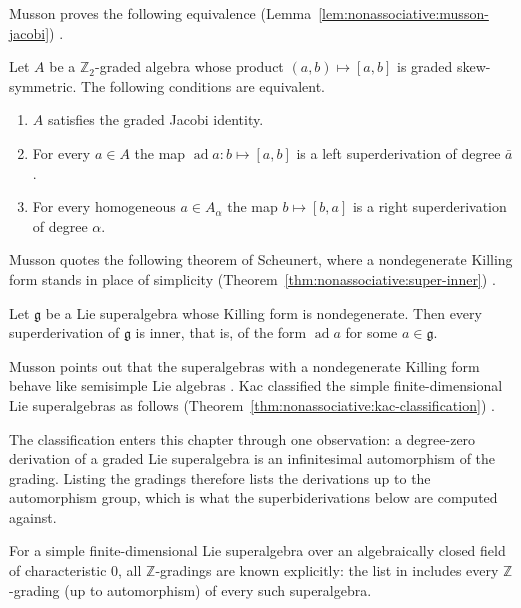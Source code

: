 Musson proves the following equivalence (Lemma~\ref{lem:nonassociative:musson-jacobi}) \cite[Lemma~1.1.2,
pp.~2--3]{Musson2012}.\begin{lemma}
\label{lem:nonassociative:musson-jacobi}
Let $A$ be a $\mathbb{Z}_2$-graded algebra whose product
$(a,b)\mapsto [a,b]$ is graded skew-symmetric. The following conditions
are equivalent.
\begin{enumerate}
\item $A$ satisfies the graded Jacobi identity.
\item For every $a\in A$ the map $\operatorname{ad} a: b\mapsto [a,b]$
is a left superderivation of degree $\bar a$.
\item For every homogeneous $a\in A_{\alpha}$ the map
$b\mapsto [b,a]$ is a right superderivation of degree $\alpha$.
\end{enumerate}
\end{lemma}

Musson quotes the following theorem of Scheunert, where a nondegenerate
Killing form stands in place of simplicity (Theorem~\ref{thm:nonassociative:super-inner})
\cite[Theorem~2.6.2, pp.~19--20]{Musson2012}.\begin{theorem}
\label{thm:nonassociative:super-inner}
Let $\mathfrak{g}$ be a Lie superalgebra whose Killing form is
nondegenerate. Then every superderivation of $\mathfrak{g}$ is inner,
that is, of the form $\operatorname{ad} a$ for some $a\in\mathfrak{g}$.
\end{theorem}

Musson points out that the superalgebras with a nondegenerate Killing
form behave like semisimple Lie algebras
\cite[p.~20]{Musson2012}. Kac classified the simple finite-dimensional
Lie superalgebras as follows (Theorem~\ref{thm:nonassociative:kac-classification}) \cite[Theorem~1,
pp.~1385--1386]{Kac1977Classification}.

The classification enters this chapter through one observation: a degree-zero
derivation of a graded Lie superalgebra is an infinitesimal automorphism of the
grading. Listing the gradings therefore lists the derivations up to the
automorphism group, which is what the superbiderivations below are computed
against.
\begin{theorem}
\label{thm:nonassociative:kac-classification}
For a simple finite-dimensional Lie superalgebra over an algebraically
closed field of characteristic $0$, all $\mathbb{Z}$-gradings are known
explicitly: the list in \cite{Kac1977Classification} includes every
$\mathbb{Z}$-grading (up to automorphism) of every such superalgebra.
\end{theorem}

